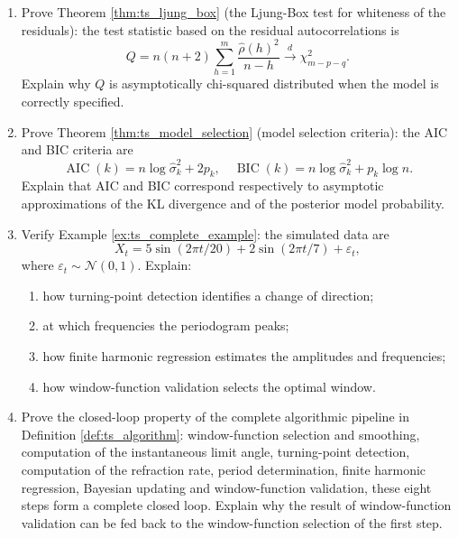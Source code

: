 \begin{enumerate}[leftmargin=3em, label=\textbf{Exercise \arabic*}]
    \item Prove Theorem \ref{thm:ts_ljung_box} (the Ljung-Box test for whiteness of the residuals):
    the test statistic based on the residual autocorrelations is
    \[
    Q=n(n+2)\sum_{h=1}^m\frac{\hat\rho(h)^2}{n-h}
    \xrightarrow{d}\chi^2_{m-p-q}.
    \]
    Explain why $Q$ is asymptotically chi-squared distributed when the model is correctly specified.

    \item Prove Theorem \ref{thm:ts_model_selection} (model selection criteria):
    the AIC and BIC criteria are
    \[
    \operatorname{AIC}(k)=n\log\hat\sigma_k^2+2p_k,
    \quad
    \operatorname{BIC}(k)=n\log\hat\sigma_k^2+p_k\log n.
    \]
    Explain that AIC and BIC correspond respectively to asymptotic approximations
    of the KL divergence and of the posterior model probability.

    \item Verify Example \ref{ex:ts_complete_example}:
    the simulated data are
    \[
    X_t=5\sin(2\pi t/20)+2\sin(2\pi t/7)+\varepsilon_t,
    \]
    where $\varepsilon_t\sim\mathcal{N}(0,1)$.
    Explain:
    \begin{enumerate}[label=(\roman*)]
        \item how turning-point detection identifies a change of direction;
        \item at which frequencies the periodogram peaks;
        \item how finite harmonic regression estimates the amplitudes and frequencies;
        \item how window-function validation selects the optimal window.
    \end{enumerate}

    \item Prove the closed-loop property of the complete algorithmic pipeline in Definition \ref{def:ts_algorithm}:
    window-function selection and smoothing, computation of the instantaneous limit angle,
    turning-point detection, computation of the refraction rate,
    period determination, finite harmonic regression, Bayesian updating and window-function validation,
    these eight steps form a complete closed loop.
    Explain why the result of window-function validation can be fed back to the window-function selection of the first step.


\end{enumerate}
